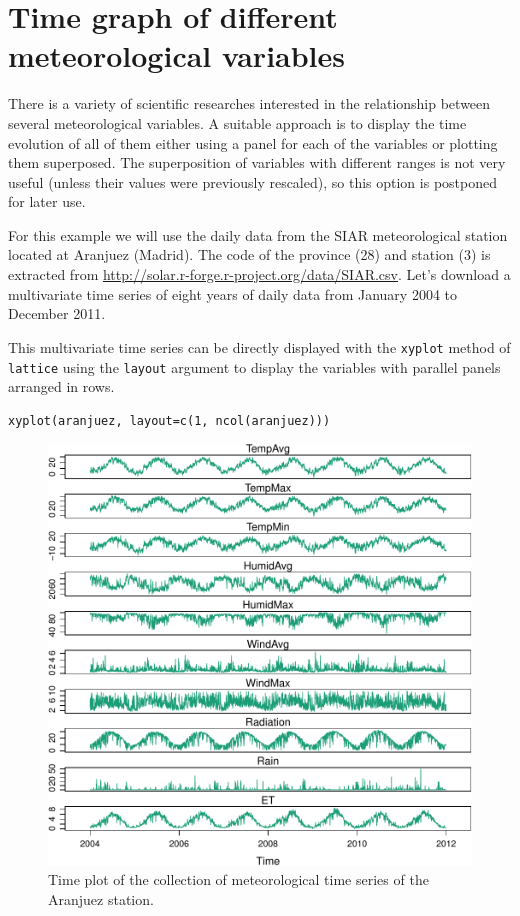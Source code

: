 


\section{Time graph of different meteorological variables}
\label{sec-1}


There is a variety of scientific researches interested in the
relationship between several meteorological variables. A suitable
approach is to display the time evolution of all of them either
using a panel for each of the variables or plotting them
superposed. The superposition of variables with different ranges
is not very useful (unless their values were previously rescaled),
so this option is postponed for later use. 

For this example we will use the daily data from the SIAR
meteorological station located at Aranjuez (Madrid). The code of
the province (28) and station (3) is extracted from
\url{http://solar.r-forge.r-project.org/data/SIAR.csv}. Let's download a
multivariate time series of eight years of daily data from January
2004 to December 2011. 



    


  

  
  
  



  

This multivariate time series can be directly displayed with the
\texttt{xyplot} method of \texttt{lattice} using the \texttt{layout} argument to
display the variables with parallel panels arranged in rows.


\lstset{language=R}
\begin{lstlisting}
xyplot(aranjuez, layout=c(1, ncol(aranjuez)))
\end{lstlisting}

\begin{figure}[htb]
\centering
\includegraphics[width=.9\linewidth]{figs/aranjuez.pdf}
\caption{\label{fig:aranjuezNaive}Time plot of the collection of meteorological time series of the Aranjuez station.}
\end{figure}

